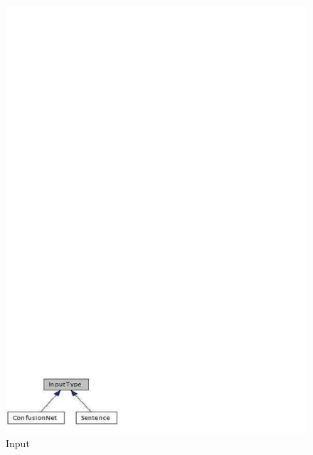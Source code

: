 \documentclass[10pt]{report}
\theoremstyle{plain}
\begin{document}
{\begin{center}
\begin{figure}[h]
\centering
\includegraphics[scale=1]{hieu-3}
\caption{Input}
\end{figure}
\end{center}

}
\end{document}
